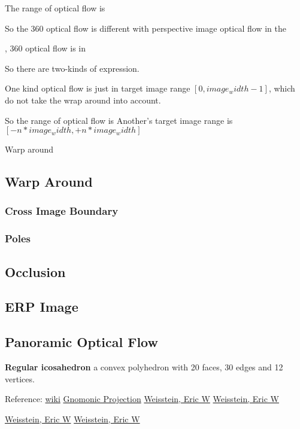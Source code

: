 The range of optical flow is 

So the 360 optical flow is different with perspective image optical flow in the 

, 360 optical flow is  in 

So there are two-kinds of expression.

One kind optical flow is just in target image range $[0, image_width - 1]$, which do not take the wrap around into account.

So the range of optical flow is 
Another's target image range is $[- n * image_width, + n * image_width]$

Warp around




\subsection{Warp Around}




\subsubsection{Cross Image Boundary}


\subsubsection{Poles}


\subsection{Occlusion}


\subsection{ERP Image}



\subsection{Panoramic Optical Flow}


\textbf{Regular icosahedron}
a convex polyhedron with 20 faces, 30 edges and 12 vertices. 

Reference:
\href{https://en.wikipedia.org/wiki/Regular_icosahedron}{wiki}
\href{https://mathworld.wolfram.com/GnomonicProjection.html}{Gnomonic Projection}
\href{https://mathworld.wolfram.com/RegularIcosahedron.html}{Weisstein, Eric W}
\href{https://math.wikia.org/wiki/Icosahedron}{Weisstein, Eric W}

\href{https://en.wikipedia.org/wiki/Gnomonic_projection}{Weisstein, Eric W}
\href{https://www.imo.net/observations/methods/visual-observation/minor/gnomonic/}{Weisstein, Eric W}

